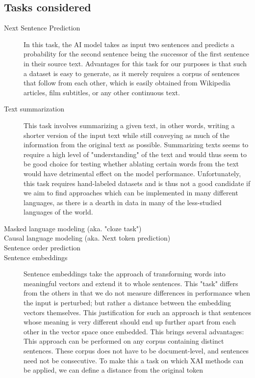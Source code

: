 \subsection{Tasks considered}
\begin{description}
	\item[Next Sentence Prediction]
	      In this task, the AI model takes as input two sentences and predicts a probability for the second sentence being the successor of the first sentence in their source text.
	      Advantages for this task for our purposes is that such a dataset is easy to generate, as it merely requires a corpus of sentences that follow from each other, which is easily obtained from Wikipedia articles, film subtitles, or any other continuous text.

	\item[Text summarization]
	      This task involves summarizing a given text, in other words, writing a shorter version of the input text while still conveying as much of the information from the original text as possible.
	      Summarizing texts seems to require a high level of "understanding" of the text and would thus seem to be good choice for testing whether ablating certain words from the text would have detrimental effect on the model performance.
	      Unfortunately, this task requires hand-labeled datasets and is thus not a good candidate if we aim to find approaches which can be implemented in many different languages, as there is a dearth in data in many of the less-studied languages of the world.

	\item[Masked language modeling (aka. "cloze task")]
	\item[Causal language modeling (aka. Next token prediction)]
	\item[Sentence order prediction]
	\item[Sentence embeddings]
	      Sentence embeddings take the approach of transforming words into meaningful vectors and extend it to whole sentences.
	      This "task" differs from the others in that we do not measure differences in performance when the input is perturbed; but rather a distance between the embedding vectors themselves.
	      This justification for such an approach is that sentences whose meaning is very different should end up further apart from each other in the vector space once embedded.
	      This brings several advantages:
	      This approach can be performed on any corpus containing distinct sentences.
	      These corpus does not have to be document-level, and sentences need not be consecutive.
	      To make this a task on which XAI methods can be applied, we can define a distance from the original token
\end{description}

